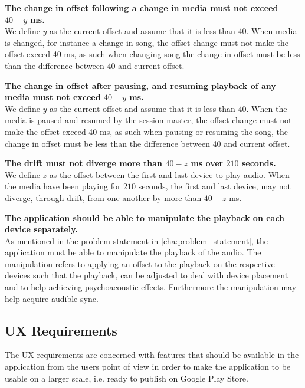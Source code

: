 \begin{eletterate}
\begin{eletterate}
        \item\label{req:change_off} \textbf{The change in offset following a change in media must not exceed $40 - y$ ms.} \hfill\\
            We define $y$ as the current offset and assume that it is less than 40.
            When media is changed, for instance a change in song, the offset change must not make the offset exceed 40 ms, as such when changing song the change in offset must be less than the difference between 40 and current offset.

        \item\label{req:pauseplay} \textbf{The change in offset after pausing, and resuming playback of any media must not exceed $40 - y$ ms.} \hfill\\
            We define $y$ as the current offset and assume that it is less than 40.
            When the media is paused and resumed by the session master, the offset change must not make the offset exceed 40 ms, as such when pausing or resuming the song, the change in offset must be less than the difference between 40 and current offset.

        \item\label{req:drift} \textbf{The drift must not diverge more than $40 - z$ ms over $210$ seconds.} \hfill\\
            We define $z$ as the offset between the first and last device to play audio.
            When the media have been playing for $210$ seconds, the first and last device, may not diverge, through drift, from one another by more than $40 - z$ ms.
    \end{eletterate}

    \item\label{req:manipulate} \textbf{The application should be able to manipulate the playback on each device separately.} \hfill\\
        As mentioned in the problem statement in \cref{cha:problem_statement}, the application must be able to manipulate the playback of the audio.
        The manipulation refers to applying an offset to the playback on the respective devices such that the playback, can be adjusted to deal with device placement and to help achieving psychoacoustic effects.
        Furthermore the manipulation may help acquire audible sync.
\end{eletterate}

\subsection*{\ac{UX} Requirements}
The \ac{UX} requirements are concerned with features that should be available in the application from the users point of view in order to make the application to be usable on a larger scale, i.e. ready to publish on Google Play Store.

